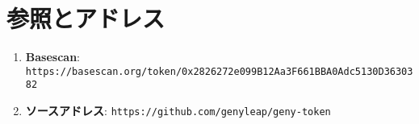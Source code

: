 \documentclass[a4paper,12pt,openany]{book}
\begin{document}
\section*{参照とアドレス}

\begin{enumerate}
    \item \textbf{Basescan}: \texttt{https://basescan.org/token/0x2826272e099B12Aa3F661BBA0Adc5130D3630382}
    \item \textbf{ソースアドレス}: \texttt{https://github.com/genyleap/geny-token}
\end{enumerate}
\end{document}

